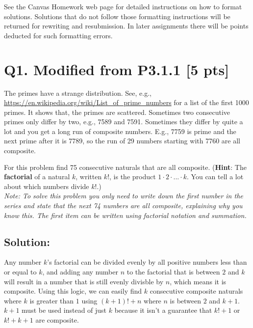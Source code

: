 \documentclass[12pt]{article}
\begin{document}

	\bigskip

	See the Canvas Homework web page for detailed instructions on how to format solutions.
	Solutions that do not follow those formatting instructions will be returned
	for rewriting and resubmission. In later assignments there will be points deducted
	for such formatting errors.

	\newpage

	\section*{\textbf{Q1. Modified from P3.1.1} [5 pts]}

	The primes have a strange distribution. See, e.g., \url{https://en.wikipedia.org/wiki/List_of_prime_numbers}
	for a list of the first 1000 primes. It shows that, the primes are scattered.
	Sometimes two consecutive primes only differ by two, e.g., 7589 and 7591. Sometimes
	they differ by quite a lot and you get a long run of composite numbers. E.g.,
	7759 is prime and the next prime after it is 7789, so the run of 29 numbers starting
	with 7760 are all composite.

	For this problem find 75 consecutive naturals that are all composite. (\textbf{Hint}:
	The \textbf{factorial} of a natural $k$, written $k!$, is the product
	$1 \cdot 2 \cdot . . . \cdot k$. You can tell a lot about which numbers divide
	$k!$.) \\

	\textit{Note: To solve this problem you only need to write down the first number
	in the series and state that the next 74 numbers are all composite, explaining
	why you know this. The first item can be written using factorial notation and summation.}

	\subsection*{\textbf{Solution:}}

	Any number $k$'s factorial can be divided evenly by all positive numbers less than
	or equal to $k$, and adding any number $n$ to the factorial that is between
	$2$ and $k$ will result in a number that is still evenly divisble by $n$, which
	means it is composite. Using this logic, we can easily find $k$ consecutive composite
	naturals where $k$ is greater than $1$ using $(k+1)!+n$ where $n$ is between $2$
	and $k+1$. $k+1$ must be used instead of just $k$ because it isn't a guarantee
	that $k!+1$ or $k!+k+1$ are composite. \\
\end{document}
